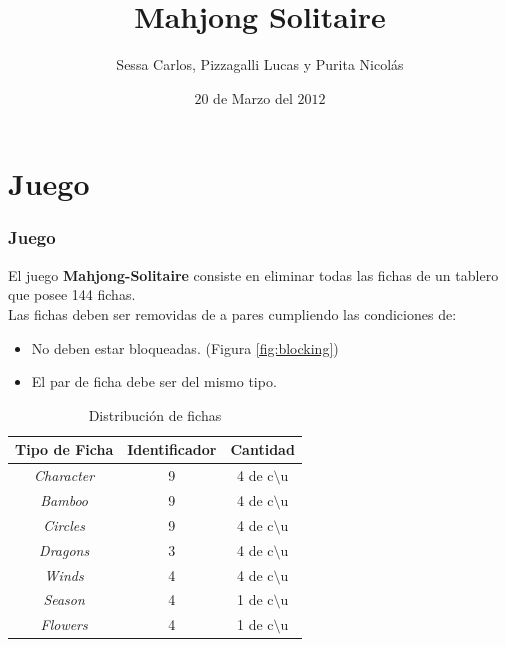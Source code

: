 \documentclass{beamer}
\title{Mahjong Solitaire}    %
\author{Sessa Carlos, Pizzagalli Lucas y Purita Nicol\'as}                 %
\institute{Instituto Tecnol\'ogico de Buenos Aires - ITBA}      %
\date{$20$ de Marzo del $2012$}                    %
\begin{document}
\begin{frame}
  \titlepage
\end{frame}

\section{Juego}

\begin{frame}
  \frametitle{Juego}   %

	El juego \textbf{Mahjong-Solitaire} consiste en eliminar todas las fichas de un tablero que posee 144 fichas. \\
	Las fichas deben ser removidas de a pares cumpliendo las condiciones de:
	
	\begin{itemize}
		\item No deben estar bloqueadas. (Figura \ref{fig:blocking})
		\item El par de ficha debe ser del mismo tipo.
	\end{itemize}		
	
\tiny{
\begin{table}
\begin{center}
	\begin{tabular}{|c|c|c|}
	\hline
	 Tipo de Ficha & Identificador & Cantidad\\
	\hline \hline
	\textit{Character} & 9 & 4 de c$\setminus$u \\
	\textit{Bamboo} & 9 & 4 de  c$\setminus$u  \\
	\textit{Circles} & 9 & 4 de  c$\setminus$u  \\
	\textit{Dragons} & 3 & 4 de  c$\setminus$u  \\	
	\textit{Winds} & 4 & 4 de  c$\setminus$u  \\
	\textit{Season} & 4 & 1 de c$\setminus$u \\
	\textit{Flowers} & 4 & 1 de  c$\setminus$u  \\
	\hline
	\end{tabular}
\end{center}
\caption{Distribuci\'on de fichas}
\label{tab:tiles}
\end{table}}
\end{frame}
\end{document}
